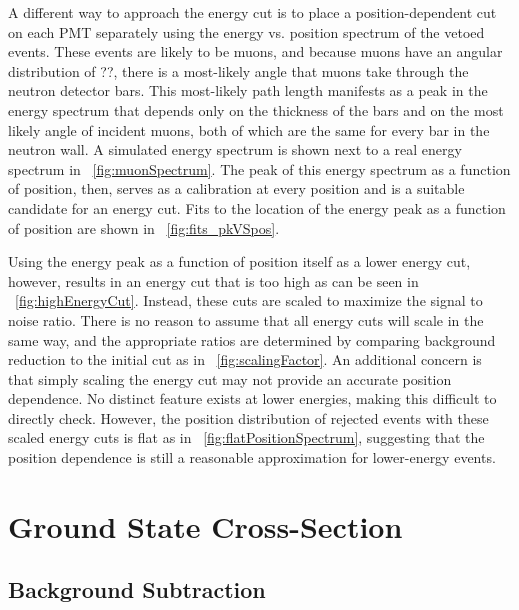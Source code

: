 A different way to approach the energy cut is to place a position-dependent cut on each PMT separately using the energy vs. position spectrum of the vetoed events.  These events are likely to be muons, and because muons have an angular distribution of ??, there is a most-likely angle that muons take through the neutron detector bars.  This most-likely path length manifests as a peak in the energy spectrum that depends only on the thickness of the bars and on the most likely angle of incident muons, both of which are the same for every bar in the neutron wall.  A simulated energy spectrum is shown next to a real energy spectrum in {\fig}~\ref{fig:muonSpectrum}.  The peak of this energy spectrum as a function of position, then, serves as a calibration at every position and is a suitable candidate for an energy cut.  Fits to the location of the energy peak as a function of position are shown in {\fig}~\ref{fig:fits_pkVSpos}.

Using the energy peak as a function of position itself as a lower energy cut, however, results in an energy cut that is too high as can be seen in {\fig}~\ref{fig:highEnergyCut}.  Instead, these cuts are scaled to maximize the signal to noise ratio.  There is no reason to assume that all energy cuts will scale in the same way, and the appropriate ratios are determined by comparing background reduction to the initial cut as in {\fig}~\ref{fig:scalingFactor}.  An additional concern is that simply scaling the energy cut may not provide an accurate position dependence.  No distinct feature exists at lower energies, making this difficult to directly check.  However, the position distribution of rejected events with these scaled energy cuts is flat as in {\fig}~\ref{fig:flatPositionSpectrum}, suggesting that the position dependence is still a reasonable approximation for lower-energy events.

\section{Ground State Cross-Section}
\subsection{Background Subtraction}

